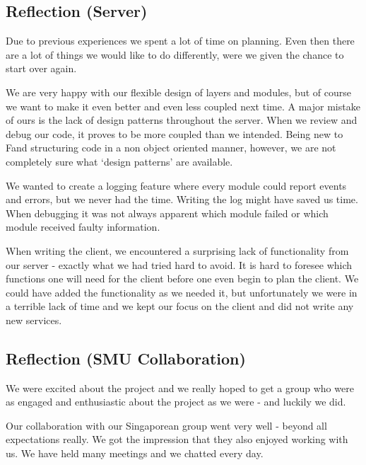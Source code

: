 \subsection{Reflection (Server)}
Due to previous experiences we spent a lot of time on planning. Even then there are a lot of things we would like to do differently, were we given the chance to start over again.

We are very happy with our flexible design of layers and modules, but of course we want to make it even better and even less coupled next time. A major mistake of ours is the lack of design patterns throughout the server. When we review and debug our code, it proves to be more coupled than we intended. Being new to F\Sh and structuring code in a non object oriented manner, however, we are not completely sure what `design patterns' are available.

We wanted to create a logging feature where every module could report events and errors, but we never had the time. Writing the log might have saved us time. When debugging it was not always apparent which module failed or which module received faulty information. 

When writing the client, we encountered a surprising lack of functionality from our server - exactly what we had tried hard to avoid. It is hard to foresee which functions one will need for the client before one even begin to plan the client. We could have added the functionality as we needed it, but unfortunately we were in a terrible lack of time and we kept our focus on the client and did not write any new services.

\subsection{Reflection (SMU Collaboration)}
We were excited about the project and we really hoped to get a group who were as engaged and enthusiastic about the project as we were - and luckily we did.

Our collaboration with our Singaporean group went very well - beyond all expectations really. We got the impression that they also enjoyed working with us. We have held many meetings and we chatted every day.
\newpage